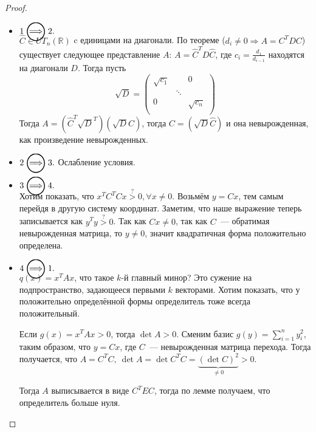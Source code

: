 \begin{proof}\leavevmode
    \begin{itemize}
        \item $1 \ora 2.$\\
            $\hat{C}\in UT_n(\mathbb{R})$ c единицами на диагонали.
            По теореме ($d_i \ne 0 \Rightarrow A = C^TDC$) %
            существует следующее представление $A$:
            $A = \hat{C}^T D \hat{C}$, где $c_i = \frac{d_1}{d_{i - 1}}$ находятся на диагонали $D$.
            Тогда пусть
            \[
                \sqrt{D} = 
                \begin{pmatrix}
                    \sqrt{c_1} & & 0 \\
                    & \ddots &\\
                    0 & & \sqrt{c_n}\\
                \end{pmatrix}
            \]
            Тогда $A = \left(\hat{C}^T\sqrt{D}^T\right)\left(\sqrt{D}\hat{C}\right)$, тогда 
            $C=\left(\sqrt{D}\hat{C}\right)$ и она невырожденная, как произведение 
            невырожденных.
        \item
            $2 \ora 3.$ Ослабление условия.
        \item
            $3 \ora 4.$\\
            Хотим показать, что $x^TC^T Cx \stackrel{?}{>} 0, \forall x\not=0$. Возьмём  $y  = Cx$, тем самым перейдя в другую систему 
            координат. Заметим, что наше выражение теперь записывается как  $y^Ty \stackrel{?}{>} 0$. Так как $Cx \not =0$, так как
            $C$~--- обратимая невырожденная матрица, то $y \not= 0$, значит квадратичная форма положительно определена.
        \item
            $4 \ora 1.$\\
            $q(x) = x^T A x$, что такое $k$-й главный минор? Это сужение на подпространство, задающееся первыми 
            $k$ векторами.
            Хотим показать, что у положительно определённой формы определитель тоже всегда положительный.
            \begin{lemma}
                Если $g(x)  = x^T A x > 0$, тогда  $\det A > 0$.
                Сменим базис $g(y) = \sum\limits_{i = 1}^{n}{y_i^2}$, таким образом, что $y = Cx$, где $C$~--- невырожденная матрица
                перехода. Тогда получается, что $A = C^TC, \ \det A = \det C^T C = \underbrace{(\det C)^2}_{\not= 0} > 0$.
            \end{lemma}
            Тогда  $A$ выписывается в виде $C^TEC$, тогда по лемме получаем, что определитель больше нуля.
    \end{itemize}
\end{proof}
